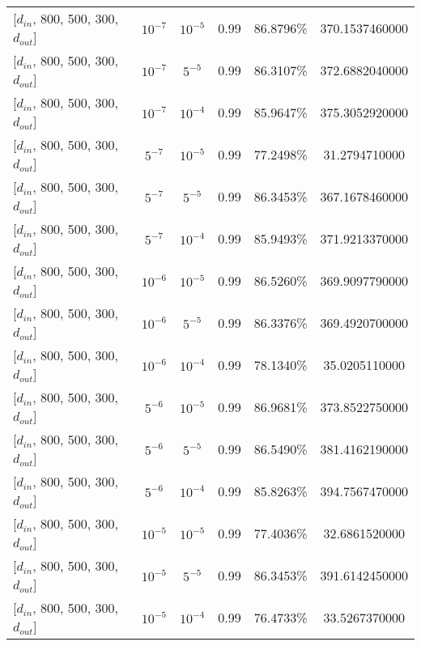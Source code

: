 \documentclass[]{report}
\begin{document}
\begin{center}
\begin{tabular}{l|c|c|c|c|c}
		 {[$d_{in}$, 800, 500, 300, $d_{out}$]}      & $10^{-7}$  & $10^{-5}$      & 0.99 & 86.8796\%   &  370.1537460000 \\
		 {[$d_{in}$, 800, 500, 300, $d_{out}$]}      & $10^{-7}$  & $5^{-5}$       & 0.99 & 86.3107\%   &  372.6882040000 \\
		 {[$d_{in}$, 800, 500, 300, $d_{out}$]}      & $10^{-7}$  & $10^{-4}$      & 0.99 & 85.9647\%   &  375.3052920000 \\
		 {[$d_{in}$, 800, 500, 300, $d_{out}$]}      & $5^{-7}$   & $10^{-5}$      & 0.99 & 77.2498\%   &   31.2794710000 \\
		 {[$d_{in}$, 800, 500, 300, $d_{out}$]}      & $5^{-7}$   & $5^{-5}$       & 0.99 & 86.3453\%   &  367.1678460000 \\
		 {[$d_{in}$, 800, 500, 300, $d_{out}$]}      & $5^{-7}$   & $10^{-4}$      & 0.99 & 85.9493\%   &  371.9213370000 \\
		 {[$d_{in}$, 800, 500, 300, $d_{out}$]}      & $10^{-6}$  & $10^{-5}$      & 0.99 & 86.5260\%   &  369.9097790000 \\
		 {[$d_{in}$, 800, 500, 300, $d_{out}$]}      & $10^{-6}$  & $5^{-5}$       & 0.99 & 86.3376\%   &  369.4920700000 \\
		 {[$d_{in}$, 800, 500, 300, $d_{out}$]}      & $10^{-6}$  & $10^{-4}$      & 0.99 & 78.1340\%   &   35.0205110000 \\
		 {[$d_{in}$, 800, 500, 300, $d_{out}$]}      & $5^{-6}$   & $10^{-5}$      & 0.99 & 86.9681\%   &  373.8522750000 \\
		 {[$d_{in}$, 800, 500, 300, $d_{out}$]}      & $5^{-6}$   & $5^{-5}$       & 0.99 & 86.5490\%   &  381.4162190000 \\
		 {[$d_{in}$, 800, 500, 300, $d_{out}$]}      & $5^{-6}$   & $10^{-4}$      & 0.99 & 85.8263\%   &  394.7567470000 \\
		 {[$d_{in}$, 800, 500, 300, $d_{out}$]}      & $10^{-5}$  & $10^{-5}$      & 0.99 & 77.4036\%   &   32.6861520000 \\
		 {[$d_{in}$, 800, 500, 300, $d_{out}$]}      & $10^{-5}$  & $5^{-5}$       & 0.99 & 86.3453\%   &  391.6142450000 \\
		 {[$d_{in}$, 800, 500, 300, $d_{out}$]}      & $10^{-5}$  & $10^{-4}$      & 0.99 & 76.4733\%   &   33.5267370000 \\
	  	\end{tabular}


\end{center}
\end{document}
